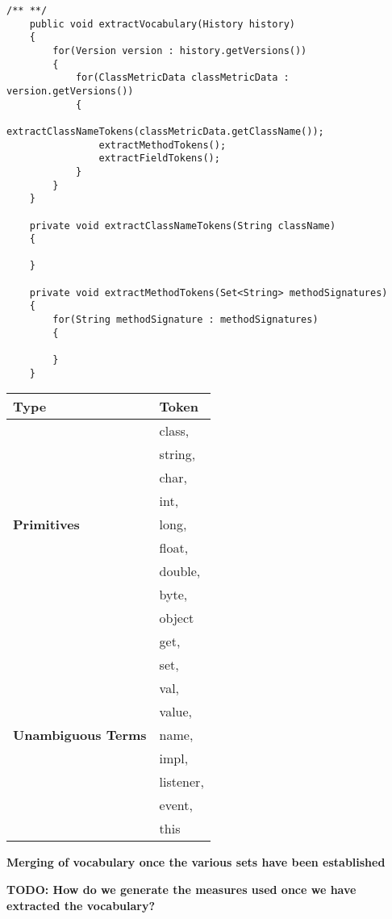 \begin{lstlisting}[caption={Same of bytecode generated for a simple Hello World method}, label={BytecodeExample}, float=t]
	/** **/
	public void extractVocabulary(History history)
	{
		for(Version version : history.getVersions())
		{
			for(ClassMetricData classMetricData : version.getVersions())
			{
				extractClassNameTokens(classMetricData.getClassName());
				extractMethodTokens();
				extractFieldTokens();
			}
		}
	}
	
	private void extractClassNameTokens(String className)
	{
		
	}
	
	private void extractMethodTokens(Set<String> methodSignatures)
	{
		for(String methodSignature : methodSignatures)
		{
			
		}
	}
\end{lstlisting}

\begin{table*}[t]
\centering
\begin{tabular}{|p{}|p{}|}
\hline
{\bf Type} & {\bf Token}\\ \hline
\multirow{9}{*}{\bf Primitives}
& class, \\
& string, \\
& char, \\
& int, \\
& long, \\
& float, \\
& double, \\
& byte, \\
& object \\
\hline
\multirow{9}{*}{\bf Unambiguous Terms}
& get, \\
& set, \\
& val, \\
& value, \\
& name, \\
& impl, \\
& listener, \\
& event, \\
& this \\
\hline
\end{tabular}
\label{tab:NotHistories}
\end{table*}

\textbf{Merging of vocabulary once the various sets have been established}

\textbf{TODO: How do we generate the measures used once we have extracted the vocabulary?}

